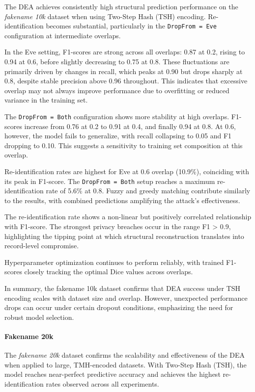The DEA achieves consistently high structural prediction performance on the \textit{fakename 10k} dataset when using Two-Step Hash (TSH) encoding. Re-identification becomes substantial, particularly in the \texttt{DropFrom = Eve} configuration at intermediate overlaps.

In the Eve setting, F1-scores are strong across all overlaps: 0.87 at 0.2, rising to 0.94 at 0.6, before slightly decreasing to 0.75 at 0.8. These fluctuations are primarily driven by changes in recall, which peaks at 0.90 but drops sharply at 0.8, despite stable precision above 0.96 throughout. This indicates that excessive overlap may not always improve performance due to overfitting or reduced variance in the training set.

The \texttt{DropFrom = Both} configuration shows more stability at high overlaps. F1-scores increase from 0.76 at 0.2 to 0.91 at 0.4, and finally 0.94 at 0.8. At 0.6, however, the model fails to generalize, with recall collapsing to 0.05 and F1 dropping to 0.10. This suggests a sensitivity to training set composition at this overlap.

Re-identification rates are highest for Eve at 0.6 overlap (10.9\%), coinciding with its peak in F1-score. The \texttt{DropFrom = Both} setup reaches a maximum re-identification rate of 5.6\% at 0.8. Fuzzy and greedy matching contribute similarly to the results, with combined predictions amplifying the attack's effectiveness.

The re-identification rate shows a non-linear but positively correlated relationship with F1-score. The strongest privacy breaches occur in the range F1 > 0.9, highlighting the tipping point at which structural reconstruction translates into record-level compromise.

Hyperparameter optimization continues to perform reliably, with trained F1-scores closely tracking the optimal Dice values across overlaps.

In summary, the fakename 10k dataset confirms that DEA success under TSH encoding scales with dataset size and overlap. However, unexpected performance drops can occur under certain dropout conditions, emphasizing the need for robust model selection.



\paragraph{Fakename 20k}

The \textit{fakename 20k} dataset confirms the scalability and effectiveness of the DEA when applied to large, TMH-encoded datasets. With Two-Step Hash (TSH), the model reaches near-perfect predictive accuracy and achieves the highest re-identification rates observed across all experiments.

